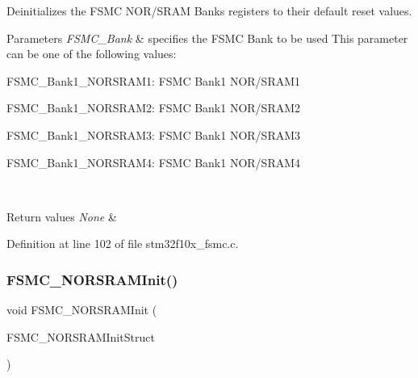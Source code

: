 Deinitializes the F\+S\+MC N\+O\+R/\+S\+R\+AM Banks registers to their default reset values. 


\begin{DoxyParams}{Parameters}
{\em F\+S\+M\+C\+\_\+\+Bank} & specifies the F\+S\+MC Bank to be used This parameter can be one of the following values\+: \begin{DoxyItemize}
\item F\+S\+M\+C\+\_\+\+Bank1\+\_\+\+N\+O\+R\+S\+R\+A\+M1\+: F\+S\+MC Bank1 N\+O\+R/\+S\+R\+A\+M1 \item F\+S\+M\+C\+\_\+\+Bank1\+\_\+\+N\+O\+R\+S\+R\+A\+M2\+: F\+S\+MC Bank1 N\+O\+R/\+S\+R\+A\+M2 \item F\+S\+M\+C\+\_\+\+Bank1\+\_\+\+N\+O\+R\+S\+R\+A\+M3\+: F\+S\+MC Bank1 N\+O\+R/\+S\+R\+A\+M3 \item F\+S\+M\+C\+\_\+\+Bank1\+\_\+\+N\+O\+R\+S\+R\+A\+M4\+: F\+S\+MC Bank1 N\+O\+R/\+S\+R\+A\+M4 \end{DoxyItemize}
\\
\hline
\end{DoxyParams}

\begin{DoxyRetVals}{Return values}
{\em None} & \\
\hline
\end{DoxyRetVals}


Definition at line 102 of file stm32f10x\+\_\+fsmc.\+c.

\mbox{\label{group___f_s_m_c___exported___functions_ga9c27816e8b17394c9ee1ce9298917b4a}} 
\subsubsection{\texorpdfstring{F\+S\+M\+C\+\_\+\+N\+O\+R\+S\+R\+A\+M\+Init()}{FSMC\_NORSRAMInit()}}
{\footnotesize\ttfamily void F\+S\+M\+C\+\_\+\+N\+O\+R\+S\+R\+A\+M\+Init (\begin{DoxyParamCaption}\item[{\hyperlink{struct_f_s_m_c___n_o_r_s_r_a_m_init_type_def}{F\+S\+M\+C\+\_\+\+N\+O\+R\+S\+R\+A\+M\+Init\+Type\+Def} $\ast$}]{F\+S\+M\+C\+\_\+\+N\+O\+R\+S\+R\+A\+M\+Init\+Struct }\end{DoxyParamCaption})}



